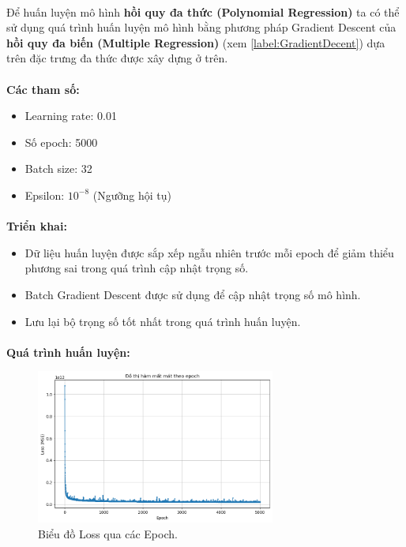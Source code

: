 \paragraph{}{Để huấn luyện mô hình \textbf{hồi quy đa thức (Polynomial Regression)} ta có thể sử dụng quá trình huấn luyện mô hình bằng phương pháp Gradient Descent của \textbf{hồi quy đa biến (Multiple Regression)} (xem \ref{label:GradientDecent}) dựa trên đặc trưng đa thức được xây dựng ở trên.}

\paragraph{}{\textbf{Các tham số:}}
\begin{itemize}
    \item Learning rate: 0.01
    \item Số epoch: 5000
    \item Batch size: 32
    \item Epsilon: $10^{-8}$ (Ngưỡng hội tụ)
\end{itemize}

\paragraph{}{\textbf{Triển khai:}}
\begin{itemize}
    \item Dữ liệu huấn luyện được sắp xếp ngẫu nhiên trước mỗi epoch để giảm thiểu phương sai trong quá trình cập nhật trọng số.
    \item Batch Gradient Descent được sử dụng để cập nhật trọng số mô hình.
    \item Lưu lại bộ trọng số tốt nhất trong quá trình huấn luyện.
\end{itemize}

\paragraph{}{\textbf{Quá trình huấn luyện:}}

\begin{figure}[H]
    \centering
    \includegraphics[width=0.7\textwidth]{img/Poly_Loss_Plot.png}
    \caption{Biểu đồ Loss qua các Epoch.}
    \label{fig:poly-loss_plot}
\end{figure}

